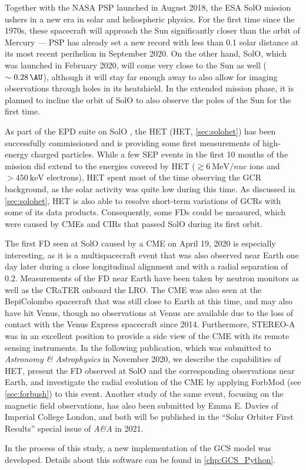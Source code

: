 Together with the NASA \ac{PSP} launched in August 2018, the ESA \ac{SolO} mission ushers in a new era in solar and heliospheric physics. For the first time since the 1970s, these spacecraft will approach the Sun significantly closer than the orbit of Mercury --- \ac{PSP} has already set a new record with less than \SI{0.1}{\AU} solar distance at its most recent perihelion in September 2020. On the other hand, \ac{SolO}, which was launched in February 2020, will come very close to the Sun as well ($\sim\SI{0.28}{\AU}$), although it will stay far enough away to also allow for imaging observations through holes in its heatshield. In the extended mission phase, it is planned to incline the orbit of \ac{SolO} to also observe the poles of the Sun for the first time.

As part of the \ac{EPD} suite on \ac{SolO} \citep{RodriguezPacheco-2019-EPD}, the \acl{HET} (\acs{HET}, \autoref{sec:solohet}) has been successfully commissioned and is providing some first measurements of high-energy charged particles. While a few \ac{SEP} events in the first 10 months of the mission did extend to the energies covered by \ac{HET} ($\gtrsim\SI{6}{\mega\electronvolt\per nuc}$ ions and $>\SI{450}{\kilo\electronvolt}$ electrons), \ac{HET} spent most of the time observing the \ac{GCR} background, as the solar activity was quite low during this time. As discussed in \autoref{sec:solohet}, \ac{HET} is also able to resolve short-term variations of \acp{GCR} with some of its data products. Consequently, some \acp{FD} could be measured, which were caused by \acp{CME} and \acp{CIR} that passed \ac{SolO} during its first orbit.

The first \ac{FD} seen at \ac{SolO} caused by a \ac{CME} on April 19, 2020 is especially interesting, as it is a multispacecraft event that was also observed near Earth one day later during a close longitudinal alignment and with a radial separation of \SI{0.2}{\AU}. Measurements of the \ac{FD} near Earth have been taken by neutron monitors as well as the \ac{CRaTER} onboard the \ac{LRO}. The \ac{CME} was also seen at the BepiColombo spacecraft that was still close to Earth at this time, and may also have hit Venus, though no observations at Venus are available due to the loss of contact with the Venus Express spacecraft since 2014. Furthermore, \acs{STEREO}-A was in an excellent position to provide a side view of the \ac{CME} with its remote sensing instruments. In the following publication, which was submitted to \textit{Astronomy \& Astrophysics} in November 2020, we describe the capabilities of \ac{HET}, present the \ac{FD} observed at \ac{SolO} and the corresponding observations near Earth, and investigate the radial evolution of the \ac{CME} by applying \acs{ForbMod} (see \autoref{sec:forbush}) to this event. Another study of the same event, focusing on the magnetic field observations, has also been submitted by Emma E. Davies of Imperial College London, and both will be published in the ``Solar Orbiter First Results'' special issue of \textit{A\&A} in 2021.

In the process of this study, a new implementation of the \ac{GCS} model \citep{Thernisien-2011-GCS} was developed. Details about this software can be found in \autoref{chp:GCS_Python}.

